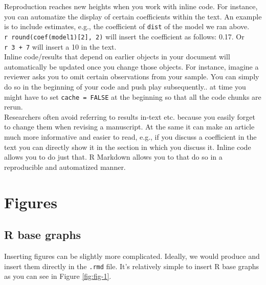 \documentclass[
  12pt,
]{article}
\newenvironment{Shaded}{\begin{snugshade}}{\end{snugshade}}
\newcommand{\KeywordTok}[1]{\textcolor[rgb]{0.13,0.29,0.53}{\textbf{#1}}}
\newcommand{\NormalTok}[1]{#1}
\newcommand{\OperatorTok}[1]{\textcolor[rgb]{0.81,0.36,0.00}{\textbf{#1}}}
\begin{document}
Reproduction reaches new heights when you work with inline code. For instance, you can automatize the display of certain coefficients within the text. An example is to include estimates, e.g., the coefficient of \texttt{dist} of the model we ran above. \texttt{\textasciigrave{}r\ round(coef(model1){[}2{]},\ 2)\textasciigrave{}} will insert the coefficient as follows: 0.17. Or \texttt{\textasciigrave{}r\ 3\ +\ 7\textasciigrave{}} will insert a 10 in the text.\\
Inline code/results that depend on earlier objects in your document will automatically be updated once you change those objects. For instance, imagine a reviewer asks you to omit certain observations from your sample. You can simply do so in the beginning of your code and push play subsequently.. at time you might have to set \texttt{cache\ =\ FALSE} at the beginning so that all the code chunks are rerun.\\
Researchers often avoid referring to results in-text etc. because you easily forget to change them when revising a manuscript. At the same it can make an article much more informative and easier to read, e.g., if you discuss a coefficient in the text you can directly show it in the section in which you discuss it. Inline code allows you to do just that. R Markdown allows you to that do so in a reproducible and automatized manner.

\hypertarget{figures}{%
\section{Figures}\label{figures}}

\hypertarget{r-base-graphs}{%
\subsection{R base graphs}\label{r-base-graphs}}

Inserting figures can be slightly more complicated. Ideally, we would produce and insert them directly in the \texttt{.rmd} file. It's relatively simple to insert R base graphs as you can see in Figure \ref{fig:fig-1}.

\begin{Shaded}
\end{Shaded}
\end{document}
